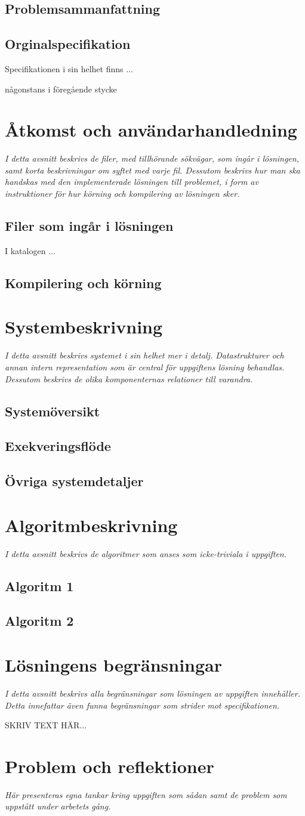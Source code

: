 \documentclass[10pt, titlepage, oneside, a4paper]{article}
\newcommand{\Section}[1]{\section{#1}\vspace{-8pt}}
\newcommand{\Subsection}[1]{\vspace{-4pt}\subsection{#1}\vspace{-8pt}}
\begin{document}
		\Subsection{Problemsammanfattning}

		\Subsection{Orginalspecifikation}
			Specifikationen i sin helhet finns ...

			någonstans i föregående stycke

	\Section{Åtkomst och användarhandledning}
		\emph{I detta avsnitt beskrivs de filer, med tillhörande sökvägar,
			som ingår i lösningen, samt korta beskrivningar om syftet med
			varje fil. Dessutom beskrivs hur man ska handskas med den
			implementerade lösningen till problemet, i form av instruktioner
			för hur körning och kompilering av lösningen sker.}
	
		\Subsection{Filer som ingår i lösningen}
			I katalogen \texttt{\fullpath} ...
			
		\Subsection{Kompilering och körning}
			

	\Section{Systembeskrivning}
		\emph{I detta avsnitt beskrivs systemet i sin helhet mer i detalj.
			Datastrukturer och annan intern representation som är central
			för uppgiftens lösning behandlas. Dessutom beskrivs de olika
			komponenternas relationer till varandra.}

		\Subsection{Systemöversikt}

		\Subsection{Exekveringsflöde}
			
		\Subsection{Övriga systemdetaljer}

	\Section{Algoritmbeskrivning}
		\emph{I detta avsnitt beskrivs de algoritmer som anses som
			icke-triviala i uppgiften.}
		
		\Subsection{Algoritm 1}
			
		\Subsection{Algoritm 2}	
	
	\Section{Lösningens begränsningar}
		\emph{I detta avsnitt beskrivs alla begränsningar som lösningen av
			uppgiften innehåller. Detta innefattar även funna begränsningar
			som strider mot specifikationen.}
		
		SKRIV TEXT HÄR...

	\Section{Problem och reflektioner}
		\emph{Här presenteras egna tankar kring uppgiften som sådan samt de
			problem som uppstått under arbetets gång.}
		
\end{document}
